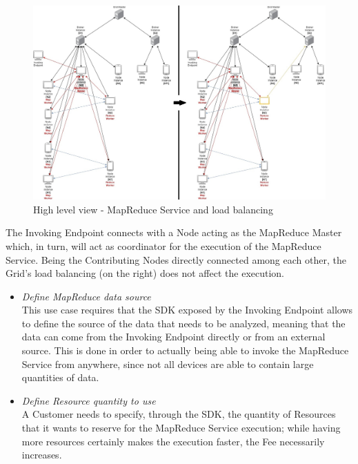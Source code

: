 \begin{itemize}
\begin{itemize}
        \begin{figure}[!ht]
            \centering
            \includegraphics[width=\linewidth]{document/chapters/chapter_6/images/mapreduce_load_balancing.jpg}
            \caption{High level view - MapReduce Service and load balancing}
            \label{fig:mapreduce_load_balancing}
        \end{figure}

        The Invoking Endpoint connects with a Node acting as the MapReduce Master which, in turn, will act as coordinator for the execution of the MapReduce Service. Being the Contributing Nodes directly connected among each other, the Grid's load balancing (on the right) does not affect the execution.


        \begin{itemize}
            \item \textit{Define MapReduce data source}\\
            This use case requires that the SDK exposed by the Invoking Endpoint allows to define the source of the data that needs to be analyzed, meaning that the data can come from the Invoking Endpoint directly or from an external source. This is done in order to actually being able to invoke the MapReduce Service from anywhere, since not all devices are able to contain large quantities of data.

            \item \textit{Define Resource quantity to use}\\
            A Customer needs to specify, through the SDK, the quantity of Resources that it wants to reserve for the MapReduce Service execution; while having more resources certainly makes the execution faster, the Fee necessarily increases.


\end{itemize}
\end{itemize}
\end{itemize}
